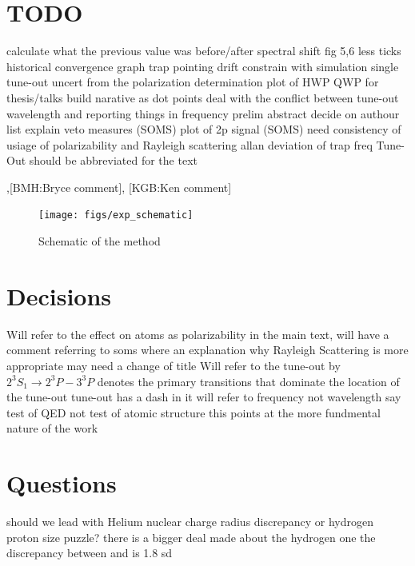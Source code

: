 \documentclass[aps,prl,
,reprint,
superscriptaddress,
onecolumn,
showpacs,preprintnumbers,
 amsmath,amssymb,
]{revtex4-1}
\newcommand{\MetastableState}{2^{3\!}S_1}%
\newcommand{\UpperStateManifold}{3^{3\!}P}%
\newcommand{\LowerStateManifold}{2^{3\!}P}%
\newcommand{\brycerev}[1]{{\color{Purple}{#1}\normalcolor}} %
\newcommand{\brycecom}[1]{{\color{ProcessBlue}[BMH:{#1}]\normalcolor}} %
\newcommand{\kencom}[1]{{\color{Red}[KGB:{#1}]\normalcolor}} %
\begin{document}
\section{TODO}
\begin{outline}[enumerate]
\1 calculate what the previous value was
    \2 before/after spectral shift
\1 fig 5,6 less ticks
\1 historical convergence graph
\1 trap pointing drift
    \2 constrain with simulation
\1 single tune-out uncert from the polarization determination
\1 plot of HWP QWP for thesis/talks
\1 build narative as dot points
\1 deal with the conflict between tune-out wavelength and reporting things in frequency
\1 prelim abstract
\1 decide on authour list
\1 explain veto measures (SOMS)
\1 plot of 2p signal (SOMS)
\1 need consistency of usiage of polarizability and Rayleigh scattering
\1 allan deviation of trap freq
\1 Tune-Out should be abbreviated for the text
\end{outline}

\brycerev{Bryce revision},\brycecom{Bryce comment}, \kencom{Ken comment}
\begin{figure}[H] 
\centering
\texttt{[image: figs/exp\_schematic]}
\caption{
Schematic of the method}
\label{fig:schematic} 
\end{figure}

\section{Decisions}
\begin{outline}[enumerate]
    \1 Will refer to the effect on atoms as polarizability in the main text, 
        \2 will have a comment referring to soms where an explanation why Rayleigh Scattering is more appropriate
        \2 may need a change of title
    \1 Will refer to the tune-out by $\MetastableState\rightarrow\LowerStateManifold-\UpperStateManifold$
        \2 denotes the primary transitions that dominate the location of the tune-out
    \1 tune-out has a dash in it
    \1 will refer to frequency not wavelength
    \1 say test of QED not test of atomic structure
        \2 this points at the more fundmental nature of the work
\end{outline}{}

\section{Questions}
\begin{outline}[enumerate]
    \1 should we lead with Helium nuclear charge radius discrepancy or hydrogen proton size puzzle?
        \2 there is a bigger deal made about the hydrogen one
        \2 the discrepancy between \cite{Rengelink2018} and \cite{PhysRevLett.119.263002} is 1.8 sd
\end{outline}{}
\end{document}

